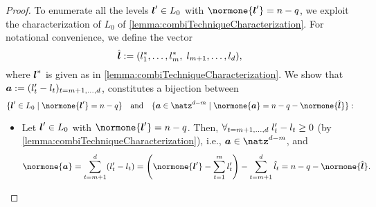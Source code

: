 \begin{proof}
  To enumerate all the levels ${\boldsymbol{l}}' \in L_0$ with $\normone{\*l'} = n - q$,
  we exploit the characterization of $L_0$ of
  \cref{lemma:combiTechniqueCharacterization}.
  For notational convenience, we define the vector
  \begin{equation}
    \hat{{\boldsymbol{l}}}
    := (l^\ast_1, \dotsc, l^\ast_m,\; l_{m+1}, \dotsc, l_d),
  \end{equation}
  where ${\boldsymbol{l}}^\ast$ is given as in \cref{lemma:combiTechniqueCharacterization}.
  We show that ${\boldsymbol{a}} := (l'_t - l_t)_{t = m+1, \dotsc, d}$,
  constitutes a bijection between
  \begin{equation}
    \{\*l' \in L_0 \mid \normone{\*l'} = n - q\}
    \quad\text{and}\quad
    \{\*a \in \natz^{d-m} \mid \normone{\*a} = n - q - \normone{\hat{\*l}}\}:
  \end{equation}
  \begin{itemize}
    \item
    Let ${\boldsymbol{l}}' \in L_0$ with $\normone{\*l'} = n - q$.
    Then, $\forall_{t=m+1,\dotsc,d}\;l'_t - l_t \ge 0$
    (by \cref{lemma:combiTechniqueCharacterization}), i.e.,
    $\*a \in \natz^{d-m}$, and
    \begin{equation}
      \normone{\*a}
      = \sum_{t=m+1}^d (l'_t - l_t)
      = \left(\normone{\*l'} - \sum_{t=1}^m l'_t\right) -
      \sum_{t=m+1}^d \hat{l}_t
      = n - q - \normone{\hat{\*l}}.
    \end{equation}
    

\end{itemize}
\end{proof}
